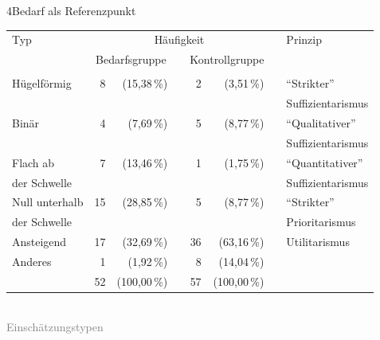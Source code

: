 \documentclass[xcolor=table,9pt,aspectratio=169]{beamer}
\begin{document}
\begin{frame}{\vspace*{10mm}4\hspace*{1em}Bedarf als Referenzpunkt}
\begin{center}
   \begin{tabular}[h]{lrrrrrrl}
      \arrayrulecolor{blue2}
      \hline
      Typ              & \multicolumn{5}{c}{Häufigkeit}      &   & Prinzip                                                              \\
      \cline{2-6}
                       & \multicolumn{2}{c}{Bedarfsgruppe}   &   & \multicolumn{2}{c}{Kontrollgruppe}   &   &                           \\
      \hline\hline\\[-0.5em]
      Hügelförmig      &  8   &  (15,38\,\%)                 &   &  2   &   (3,51\,\%)                  &   & \enquote{Strikter}        \\
                       &      &                              &   &      &                               &   & Suffizientarismus         \\[1ex]
      Binär            &  4   &   (7,69\,\%)                 &   &  5   &   (8,77\,\%)                  &   & \enquote{Qualitativer}    \\
                       &      &                              &   &      &                               &   & Suffizientarismus         \\[1ex]
      Flach ab         &  7   &  (13,46\,\%)                 &   &  1   &   (1,75\,\%)                  &   & \enquote{Quantitativer}   \\
      der Schwelle     &      &                              &   &      &                               &   & Suffizientarismus         \\[1ex]
      Null unterhalb   & 15   &  (28,85\,\%)                 &   &  5   &   (8,77\,\%)                  &   & \enquote{Strikter}        \\
      der Schwelle     &      &                              &   &      &                               &   & Prioritarismus            \\[1ex]
      Ansteigend       & 17   &  (32,69\,\%)                 &   & 36   &  (63,16\,\%)                  &   & Utilitarismus             \\[1ex]
      Anderes          &  1   &   (1,92\,\%)                 &   &  8   &  (14,04\,\%)                  &   &                           \\
      \hline
                       & 52   & (100,00\,\%)                 &   & 57   & (100,00\,\%)                  &   &                           \\
      \hline
   \end{tabular}\\
   \smallskip
   \textcolor{gray}{Einschätzungstypen}
\end{center}
\end{frame}
\end{document}

